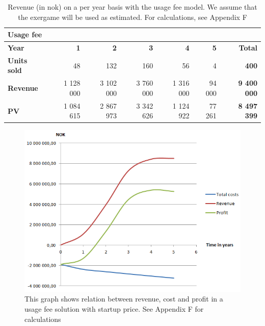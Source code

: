 \begin{table}
 \caption[Revenue with use of usage fee model]{Revenue (in \ac{nok}) on a per year basis with the usage fee model. We assume that the exergame will be used as estimated. For calculations, see Appendix F}
\begin{tabular}{|l|r|r|r|r|r|r|}
        \hline
       \textbf{Usage fee}  & & & & & & \\ \hline
      \textbf{Year} & \textbf{1} & \textbf{2} & \textbf{3} & \textbf{4} & \textbf{5} & \textbf{Total}\\ \hline
	   \textbf{Units sold} & 48 & 132 & 160 & 56 & 4 & \textbf{400}\\ \hline
	   \textbf{Revenue} & 1 128 000 & 3 102 000 & 3 760 000 & 1 316 000 & 94 000 & \textbf{9 400 000} \\ \hline  
	   \textbf{PV} & 1 084 615 & 2 867 973 & 3 342 626 & 1 124 922 & 77 261 & \textbf{8 497 399}  \\ \hline
    \end{tabular}
    \label{tab:revusage}
\end{table}
\begin{figure}
\begin{center}
\includegraphics[scale=0.8]{profitusagefee}
\caption[Profit, revenue and cost for a usage fee solution]{This graph shows relation between revenue, cost and profit in a usage fee solution with startup price. See Appendix F for calculations}
\label{fig:ProfitUsageFee}
\end{center}
\end{figure}
\newpage
